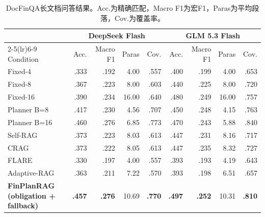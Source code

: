 \begin{table}[htbp]
\centering
{}
\setlength{\tabcolsep}{2pt}
\caption{DocFinQA长文档问答结果。Acc.为精确匹配，Macro F1为宏F1，Paras为平均段落，Cov.为覆盖率。}
\label{tab:docfinqa}
\begin{tabular}{lrrrrrrrr}
\toprule
 & \multicolumn{4}{c}{DeepSeek Flash} & \multicolumn{4}{c}{GLM 5.3 Flash} \\
\cmidrule(lr){2-5}\cmidrule(lr){6-9}
Condition & Acc. & Macro F1 & Paras & Cov. & Acc. & Macro F1 & Paras & Cov. \\
\midrule
Fixed-4 & .333 & .192 & 4.00 & .557 & .400 & .199 & 4.00 & .653 \\
Fixed-8 & .367 & .223 & 8.00 & .603 & .440 & .225 & 8.00 & .720 \\
Fixed-16 & .390 & .234 & 16.00 & .640 & .480 & .249 & 16.00 & .757 \\
Planner B=8 & .417 & .230 & 4.56 & .707 & .450 & .248 & 4.15 & .763 \\
Planner B=16 & .460 & .276 & 6.85 & .773 & .470 & .243 & 5.88 & .840 \\
Self-RAG & .373 & .223 & 8.03 & .613 & .447 & .231 & 8.16 & .717 \\
CRAG & .373 & .222 & 8.05 & .613 & .447 & .235 & 8.32 & .727 \\
FLARE & .330 & .197 & 4.00 & .557 & .393 & .193 & 4.19 & .643 \\
Adaptive-RAG & .363 & .211 & 7.22 & .570 & .393 & .198 & 6.51 & .657 \\
\midrule
\textbf{FinPlanRAG (obligation + fallback)} & \textbf{.457} & \textbf{.276} & 10.69 & \textbf{.770} & \textbf{.497} & \textbf{.252} & 10.31 & \textbf{.810} \\
\bottomrule
\end{tabular}
\end{table}
